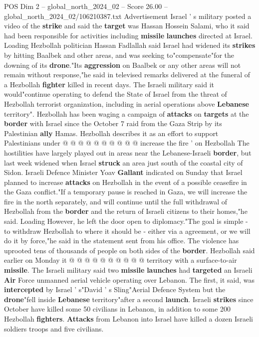 \begin{textsample}{POS Dim 2 – global\_north\_2024\_02 – Score 26.00 – global\_north\_2024\_02/106210387.txt}
Advertisement Israel ' s military posted a video of the \textbf{strike} and said the \textbf{target} was Hassan Hossein Salami, who it said had been responsible for activities including \textbf{missile} \textbf{launches} directed at Israel.
Loading Hezbollah politician Hassan Fadlallah said Israel had widened its \textbf{strikes} by hitting Baalbek and other areas, and was seeking to"compensate"for the downing of its \textbf{drone}."Its \textbf{aggression} on Baalbek or any other areas will not remain without response,"he said in televised remarks delivered at the funeral of a Hezbollah \textbf{fighter} killed in recent days.
The Israeli military said it would"continue operating to defend the State of Israel from the threat of Hezbollah terrorist organization, including in aerial operations above \textbf{Lebanese} territory".
Hezbollah has been waging a campaign of \textbf{attacks} on \textbf{targets} at the \textbf{border} with Israel since the October 7 raid from the Gaza Strip by its Palestinian \textbf{ally} Hamas.
Hezbollah describes it as an effort to support Palestinians under @ @ @ @ @ @ @ @ @ @ increase the fire ' on Hezbollah The hostilities have largely played out in areas near the Lebanese-Israeli \textbf{border}, but last week widened when Israel \textbf{struck} an area just south of the coastal city of Sidon.
Israeli Defence Minister Yoav \textbf{Gallant} indicated on Sunday that Israel planned to increase \textbf{attacks} on Hezbollah in the event of a possible ceasefire in the Gaza conflict."If a temporary pause is reached in Gaza, we will increase the fire in the north separately, and will continue until the full withdrawal of Hezbollah from the \textbf{border} and the return of Israeli citizens to their homes,"he said.
Loading However, he left the door open to diplomacy."The goal is simple - to withdraw Hezbollah to where it should be - either via a agreement, or we will do it by force,"he said in the statement sent from his office.
The violence has uprooted tens of thousands of people on both sides of the \textbf{border}.
Hezbollah said earlier on Monday it @ @ @ @ @ @ @ @ @ @ territory with a surface-to-air \textbf{missile}.
The Israeli military said two \textbf{missile} \textbf{launches} had \textbf{targeted} an Israeli \textbf{Air} Force unmanned aerial vehicle operating over Lebanon.
The first, it said, was \textbf{intercepted} by Israel ' s"David ' s Sling"Aerial Defence System but the \textbf{drone}"fell inside \textbf{Lebanese} territory"after a second \textbf{launch}.
Israeli \textbf{strikes} since October have killed some 50 civilians in Lebanon, in addition to some 200 Hezbollah \textbf{fighters}. \textbf{Attacks} from Lebanon into Israel have killed a dozen Israeli soldiers troops and five civilians.

\end{textsample}
